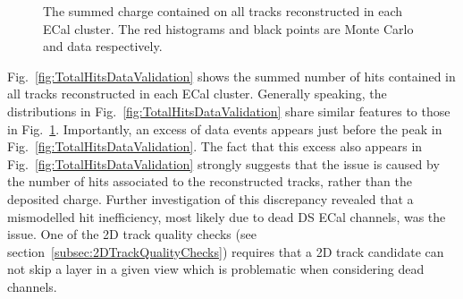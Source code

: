 \begin{figure}%
  \centering
  \caption{The summed charge contained on all tracks reconstructed in each ECal cluster.  The red histograms and black points are Monte Carlo and data respectively.}
  \label{fig:TotalChargeDataValidation}
\end{figure}
\newline
\newline
Fig.~\ref{fig:TotalHitsDataValidation} shows the summed number of hits contained in all tracks reconstructed in each ECal cluster.  Generally speaking, the distributions in Fig.~\ref{fig:TotalHitsDataValidation} share similar features to those in Fig.~\ref{fig:TotalChargeDataValidation}.  Importantly, an excess of data events appears just before the peak in Fig.~\ref{fig:TotalHitsDataValidation}.  The fact that this excess also appears in Fig.~\ref{fig:TotalHitsDataValidation} strongly suggests that the issue is caused by the number of hits associated to the reconstructed tracks, rather than the deposited charge.  Further investigation of this discrepancy revealed that a mismodelled hit inefficiency, most likely due to dead DS ECal channels, was the issue.  One of the 2D track quality checks (see section~\ref{subsec:2DTrackQualityChecks}) requires that a 2D track candidate can not skip a layer in a given view which is problematic when considering dead channels.  
